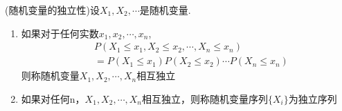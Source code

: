 \begin{define}
(随机变量的独立性)设$X_1,X_2,\cdots$是随机变量.
\begin{enumerate}
\item
如果对于任何实数$x_1,x_2,\cdots,x_n$,
\begin{equation}
\begin{split}
& P(X_1\leqslant x_1,X_2\leqslant x_2,\cdots ,X_n\leqslant x_n)\\
& =P(X_1\leqslant x_1)P(X_2\leqslant x_2)\cdots P
(X_n\leqslant x_n)
\end{split}
\end{equation}
则称随机变量$X_1,X_2,\cdots,X_n$相互独立
\item 如果对任何n，$X_1,X_2,\cdots,X_n$相互独立，则称随机变量序列$\{X_i\}$为独立序列
\end{enumerate}
\end{define}


